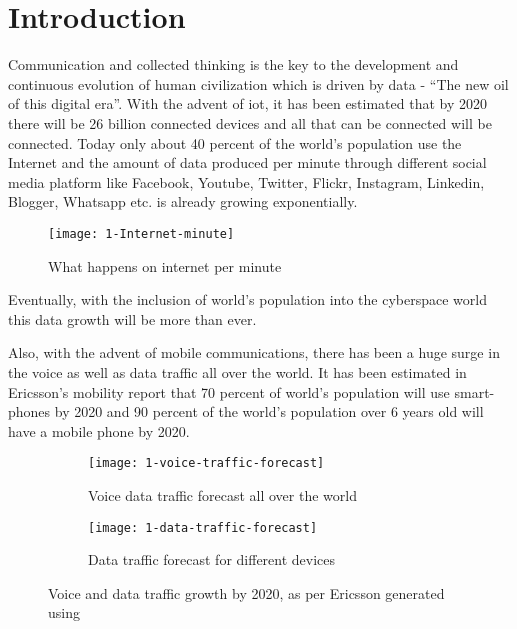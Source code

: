 \documentclass[../report.tex]{subfiles}
\begin{document}
	
	
\chapter{Introduction} 
Communication and collected thinking is the key to the development and continuous evolution of human civilization which is driven by data - \textquotedblleft The new oil of this digital era\textquotedblright. With the advent of \gls{iot}, it has been estimated that by 2020 there will be 26 billion connected devices \cite{gartner_iot} and all that can be connected will be connected. Today only about 40 percent \cite{internet_users} of the world’s population use the Internet and the amount of data produced per minute through different social media platform like Facebook, Youtube, Twitter, Flickr, Instagram, Linkedin, Blogger, Whatsapp etc. is already growing exponentially. 

\begin{figure}[h]
	\centering
	\texttt{[image: 1-Internet-minute]}
	\caption{What happens on internet per minute \cite{internet_minute}}
	\label{fig:1_internet_minute}
\end{figure}

\noindent Eventually, with the inclusion of world's population into the cyberspace world this data growth will be more than ever. \par

Also, with the advent of mobile communications, there has been a huge surge in the voice as well as data traffic all over the world. It has been estimated in Ericsson's mobility report \cite{ericsson_mobility_report} that 70 percent of world's population will use smart-phones by 2020 and 90 percent of the world's population over 6 years old will have a mobile phone by 2020. 

\begin{figure}[!tbp] %
	\begin{subfigure}[t]{0.45\textwidth}
		\texttt{[image: 1-voice-traffic-forecast]}
		\caption{Voice data traffic forecast all over the world}
		\label{fig:1_voice_traffic_forecast}
	\end{subfigure}
	\hfill
	\begin{subfigure}[t]{0.45\textwidth}
		\texttt{[image: 1-data-traffic-forecast]}
		\caption{Data traffic forecast for different devices}
		\label{fig:1_data_traffic_forecast}
	\end{subfigure}
	\caption{Voice and data traffic growth by 2020, as per Ericsson generated using \cite{ericsson_traffic_exploration}}
\end{figure}
\end{document}
